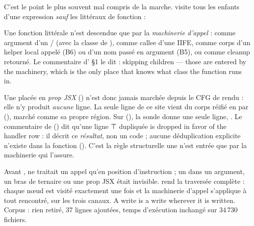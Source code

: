 C'est le point le plus souvent mal compris de la marche.  visite tous les enfants d'une expression \emph{sauf} les littéraux de fonction :


Une fonction littérale n'est descendue que par la \emph{machinerie d'appel} : comme argument d'un / (avec la classe de ), comme callee d'une IIFE, comme corps d'un helper local appelé (B6) ou d'un nom passé en argument (B5), ou comme cleanup retourné. Le commentaire d' §1 le dit : \og skipping  children --- those are entered by the machinery, which is the only place that knows what class the function runs in\fg{}.

\begin{piege}
Une  placée en \emph{prop JSX} () n'est donc jamais marchée depuis le CFG de rendu : elle n'y produit \emph{aucune} ligne. La seule ligne de ce site vient du corps réifié en  par  (), marché comme sa propre région. Sur  (), la sonde donne une seule ligne, . Le commentaire de  () dit qu'une ligne ⊤ dupliquée \og is dropped in favor of the handler row\fg{} : il décrit ce \emph{résultat}, non un code ; aucune déduplication explicite n'existe dans la fonction (). C'est la règle structurelle \og une  n'est entrée que par la machinerie\fg{} qui l'assure.
\end{piege}

\begin{decision}
Avant ,  ne traitait un appel qu'en position d'instruction ; un  dans un argument, un bras de ternaire ou une prop JSX était invisible.  rend la traversée complète : chaque nœud est visité exactement une fois et la machinerie d'appel s'applique à tout  rencontré, sur les trois canaux. \og A write is a write wherever it is written.\fg{} Corpus : rien retiré, 37 lignes ajoutées, temps d'exécution inchangé sur 34\,730 fichiers.
\end{decision}

